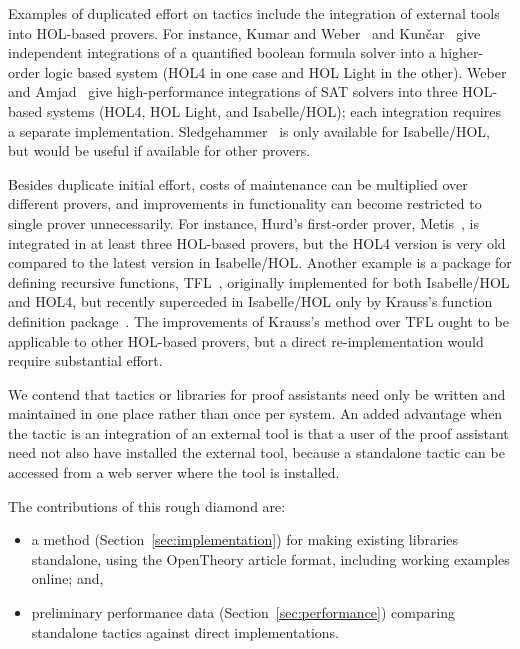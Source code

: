 \documentclass{llncs}
\newcommand{\OpenTheory}{OpenTheory\xspace}
\newcommand{\secref}[1]{Section~\ref{sec:#1}}
\begin{document}
Examples of duplicated effort on tactics include the integration of external tools into HOL-based provers.
For instance, Kumar and Weber~\cite{DBLP:conf/itp/KumarW11} and Kun\v{c}ar~\cite{DBLP:conf/itp/Kuncar11} give independent integrations of a quantified boolean formula solver into a higher-order logic based system (HOL4 in one case and HOL Light in the other).
Weber and Amjad~\cite{weber09efficiently} give high-performance integrations of SAT solvers into three HOL-based systems (HOL4, HOL Light, and Isabelle/HOL); each integration requires a separate implementation.
Sledgehammer~\cite{DBLP:journals/japll/MengP09,Paulson_threeyears,DBLP:conf/frocos/BlanchetteBN11} is only available for Isabelle/HOL, but would be useful if available for other provers.

Besides duplicate initial effort, costs of maintenance can be multiplied over different provers, and improvements in functionality can become restricted to single prover unnecessarily.
For instance, Hurd's first-order prover, Metis~\cite{DBLP:conf/cade/Hurd02}, is integrated in at least three HOL-based provers, but the HOL4 version is very old compared to the latest version in Isabelle/HOL.
Another example is a package for defining recursive functions, TFL~\cite{slindphd}, originally implemented for both Isabelle/HOL and HOL4, but recently superceded in Isabelle/HOL only by Krauss's function definition package~\cite{DBLP:journals/jar/Krauss10}.
The improvements of Krauss's method over TFL ought to be applicable to other HOL-based provers, but a direct re-implementation would require substantial effort.

We contend that tactics or libraries for proof assistants need only be written and maintained in one place rather than once per system. 
An added advantage when the tactic is an integration of an external tool is that a user of the proof assistant need not also have installed the external tool, because a standalone tactic can be accessed from a web server where the tool is installed.

The contributions of this rough diamond are:
\begin{itemize}
\item
a method (\secref{implementation}) for making existing libraries standalone, using the \OpenTheory article format, including working examples online; and,
\item
preliminary performance data (\secref{performance}) comparing standalone tactics against direct implementations.
\end{itemize}
\end{document}
